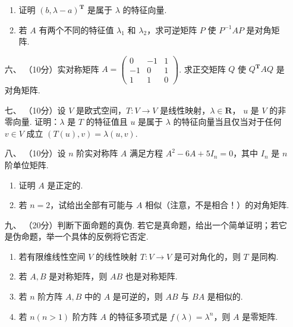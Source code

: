 \begin{enumerate}
\begin{enumerate}[label=(\arabic*)]
        \item 证明 $(b,\lambda-a)^\mathbf{T}$ 是属于 $\lambda$ 的特征向量.

        \item 若 $A$ 有两个不同的特征值 $\lambda_1$ 和 $\lambda_2$，求可逆矩阵 $P$ 使 $P^{-1}AP$ 是对角矩阵.
    \end{enumerate}

\item [六、]（10分）实对称矩阵 $A=\begin{pmatrix}0 & -1 & 1 \\ -1 & 0 & 1 \\ 1 & 1 & 0\end{pmatrix}$.  求正交矩阵 $Q$ 使 $Q^\mathbf{T}AQ$ 是对角矩阵.

    \item [七、]（10分）设 $V$ 是欧式空间，$T:V\to V$ 是线性映射，$\lambda \in \mathbf{R}$， $u$ 是 $V$ 的非零向量. 证明：$\lambda$ 是 $T$ 的特征值且 $u$ 是属于 $\lambda$ 的特征向量当且仅当对于任何 $v\in V$ 成立 $(T(u),v) = \lambda(u,v)$.

    \item [八、]（10分）设 $n$ 阶实对称阵 $A$ 满足方程 $A^2-6A+5I_n=0$，其中 $I_n$ 是 $n$ 阶单位矩阵.
    \begin{enumerate}[label=(\arabic*)]
        \item 证明 $A$ 是正定的.

        \item 若 $n=2$，试给出全部有可能与 $A$ 相似（注意，不是相合！）的对角矩阵.
    \end{enumerate}

\item [九、]（20分）判断下面命题的真伪. 若它是真命题，给出一个简单证明；若它是伪命题，举一个具体的反例将它否定.
    \begin{enumerate}[label=(\arabic*)]
        \item 若有限维线性空间 $V$ 的线性映射 $T:V \to V$ 是可对角化的，则 $T$ 是同构.

        \item 若 $A,B$ 是对称矩阵，则 $AB$ 也是对称矩阵.

        \item 若 $n$ 阶方阵 $A,B$ 中的 $A$ 是可逆的，则 $AB$ 与 $BA$ 是相似的.

        \item 若 $n(n>1)$ 阶方阵 $A$ 的特征多项式是 $f(\lambda)=\lambda^n$，则 $A$ 是零矩阵.
    \end{enumerate}
\end{enumerate}

\clearpage
